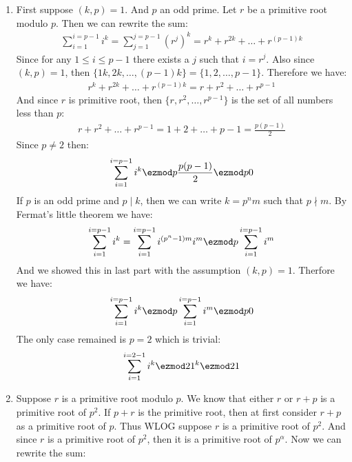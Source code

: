 \begin{enumerate}[label=\ilabel]
    \item 
        First suppose $(k, p) = 1$. And $p$ an odd prime. Let $r$ be a primitive root modulo $p$. Then we can rewrite the sum:
        \begin{gather*}
            \sum_{i = 1}^{i = p - 1} i^k = \sum_{j = 1}^{j = p - 1} (r^{j})^k = r^k + r^{2k} + \dots + r^{(p - 1)k}
        \end{gather*}
        Since for any $1 \le i \le p-1$ there exists a $j$ such that $i = r^j$. Also since $(k, p) = 1$, then $\{1k, 2k, \dots, (p - 1)k\} = \{1, 2, \dots, p - 1\}$. 
        Therefore we have:
        \begin{gather*}
            r^k + r^{2k} + \dots + r^{(p - 1)k} = r + r^2 + \dots + r^{p - 1}
        \end{gather*}
        And since $r$ is primitive root, then $\{r, r^2, \dots, r^{p-1}\}$ is the set of all numbers less than $p$:
        \begin{gather*}
            r + r^2 + \dots + r^{p - 1} = 1 + 2 + \dots + p - 1 = \frac{p(p - 1)}{2}
        \end{gather*}
        Since $p \ne 2$ then:
        \begin{gather*}
            \sum_{i = 1}^{i = p - 1} i^k \ezmod p \frac{p(p - 1)}{2} \ezmod p  0
        \end{gather*}
        If $p$ is an odd prime and $p \mid k$, then we can write $k = p^n m$ such that $p \nmid m$. By Fermat's little theorem we have:
        \begin{gather*}
            \sum_{i = 1}^{i = p - 1} i^k = \sum_{i = 1}^{i = p - 1} i^{(p^n - 1)m} i^m  \ezmod p \sum_{i = 1}^{i = p - 1} i^m
        \end{gather*}
        And we showed this in last part with the assumption $(k, p) = 1$. Therfore we have:
        \begin{gather*}
            \sum_{i = 1}^{i = p - 1} i^k \ezmod p \sum_{i = 1}^{i = p - 1} i^m \ezmod p 0
        \end{gather*}
        The only case remained is $p = 2$ which is trivial:
        \begin{gather*}
            \sum_{i = 1}^{i = 2 - 1} i^k \ezmod 2 1^k \ezmod 2 1
        \end{gather*}
    \item 
        Suppose $r$ is a primitive root modulo $p$. We know that either $r$ or $r + p$ is a primitive root of $p^2$. If $p + r$ is the primitive root, then at first consider $r + p$ as a primitive root of $p$. Thus WLOG suppose $r$ is a primitive root of $p^2$. And since $r$ is a primitive root of $p^2$, then it is a primitive root of $p^\alpha$. Now we can rewrite the sum:

\end{enumerate}
